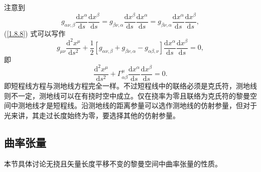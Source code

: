 \documentclass[11pt, a4paper, oneside, onecolumn]{ctexart}
\numberwithin{equation}{subsection}
\begin{document}
注意到
\begin{equation}
g_{\alpha\nu,\beta}\frac{\mathrm{d}x^{\alpha}}{\mathrm{d}s}\frac{\mathrm{d}x^{\beta}}{\mathrm{d}s}=g_{\beta\nu,\alpha}\frac{\mathrm{d}x^{\beta}}{\mathrm{d}s}\frac{\mathrm{d}x^{\alpha}}{\mathrm{d}s}=g_{\beta\nu,\alpha}\frac{\mathrm{d}x^{\alpha}}{\mathrm{d}s}\frac{\mathrm{d}x^{\beta}}{\mathrm{d}s},
\end{equation}
(\ref{1.8.8}) 式可以写作
\begin{equation}
g_{\mu\nu}\frac{\mathrm{d}^{2}x^{\mu}}{\mathrm{d}s^{2}}+\frac12\left[g_{\alpha\nu,\beta}+g_{\beta\nu,\alpha}-g_{\alpha\beta,\nu}\right]\frac{\mathrm{d}x^{\alpha}}{\mathrm{d}s}\frac{\mathrm{d}x^{\beta}}{\mathrm{d}s}=0,
\end{equation}
即
\begin{equation}
\frac{\mathrm{d}^{2}x^{\mu}}{\mathrm{d}s^{2}}+\Gamma_{\alpha\beta}^{\mu}\frac{\mathrm{d}x^{\alpha}}{\mathrm{d}s}\frac{\mathrm{d}x^{\beta}}{\mathrm{d}s}=0.
\end{equation}
即短程线方程与测地线方程完全一样。不过短程线中的联络必须是克氏符，测地线则不一定，测地线可以在有挠时空中成立。仅在挠率为零且联络为克氏符的黎曼空间中测地线才是短程线。沿测地线的距离参量可以选作测地线的仿射参量，但对于光来讲，其走过长度始终为零，要选择其他的仿射参量。

\subsection{曲率张量}
本节具体讨论无挠且矢量长度平移不变的黎曼空间中曲率张量的性质。
\end{document}
